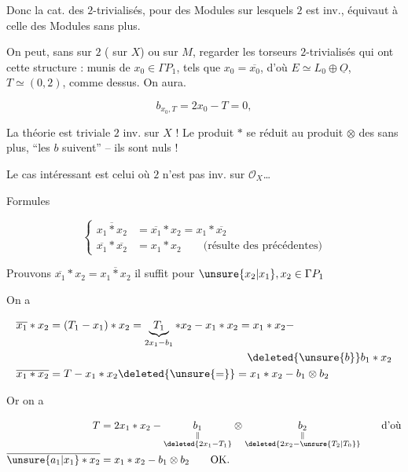 

Donc la cat. des  $2$-trivialisés, pour des Modules sur lesquels $2$ est inv., équivaut à celle des Modules sans plus.

On peut, sans  sur $2$ ( sur $X$) ou sur $M$, regarder les  torseurs $2$-trivialisés qui ont cette structure : munis de  $x_0\in\Gamma P_1$,
tels que $x_0=\overline{x_0}$, d'où $E\simeq L_0\oplus\underline{O}$, $T\simeq(0,2)$, comme dessus. On aura.

\[ b_{x_0,T}=2x_0-T=0,\]

La théorie est  triviale  $2$ inv. sur $X$ ! Le produit $*$ se réduit au produit $\otimes$ des  sans plus, ``les $b$ suivent'' -- ils sont nuls !

Le cas  intéressant est celui où $2$ n'est  pas inv. sur $\mathcal{O}_X$\ldots

Formules

\[ \left\{\begin{aligned}\overline{x_1*x_2}&=\overline{x_1}*x_2=x_1*\overline{x_2}\\ \overline{x_1}*\overline{x_2}&=x_1*x_2\qquad\text{(résulte des précédentes)}\end{aligned}\right. \]

 Prouvons $\overline{x_1}*x_2=\overline{x_1*x_2}$ il suffit pour $\unsure{x_2|x_1},x_2\in\Gamma P_{1}$

On a

\[ \begin{aligned}\overline{x_1}*x_2&=(T_1-x_1)*x_2=\underbrace{T_1}_{2x_1-b_1}*x_2-x_1*x_2=x_1*x_2-\\ &\hspace{18em}\deleted{\unsure{b}}b_1*x_2\\ \overline{x_1*x_2}&=T-x_1*x_2\deleted{\unsure{=}}=x_1*x_2-b_1\otimes b_2\end{aligned} \]

Or on a

\[ \begin{aligned}T&=2x_1*x_2-\underset{\substack{\Vert\\\deleted{2x_1-T_1}}}{b_1}\otimes\underset{\substack{\Vert\\\deleted{2x_2-\unsure{T_2|T_0}}}}{b_2}\qquad\text{d'où}\\ \overline{\unsure{a_1|x_1}*x_2}&=x_1*x_2-b_1\otimes b_2\qquad\text{OK.}\end{aligned} \]
